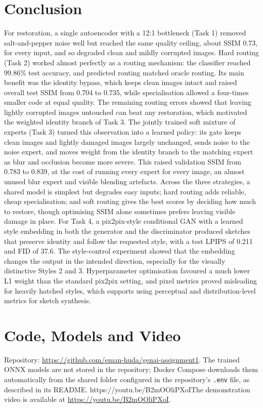 \documentclass[conference]{IEEEtran}
\newcommand*{\videourl}{https://youtu.be/B2mOOliPXoI}
\newcommand{\videosentence}{\ifx\videourl\empty\else The demonstration video is available at \url{\videourl}.\fi}
\begin{document}
\section{Conclusion}
For restoration, a single autoencoder with a 12:1 bottleneck (Task 1) removed salt-and-pepper noise well but reached the same quality ceiling, about SSIM 0.73, for every input, and so degraded clean and mildly corrupted images. Hard routing (Task 2) worked almost perfectly as a routing mechanism: the classifier reached 99.86\% test accuracy, and predicted routing matched oracle routing. Its main benefit was the identity bypass, which keeps clean images intact and raised overall test SSIM from 0.704 to 0.735, while specialisation allowed a four-times smaller code at equal quality. The remaining routing errors showed that leaving lightly corrupted images untouched can beat any restoration, which motivated the weighted identity branch of Task 3. The jointly trained soft mixture of experts (Task 3) turned this observation into a learned policy: its gate keeps clean images and lightly damaged images largely unchanged, sends noise to the noise expert, and moves weight from the identity branch to the matching expert as blur and occlusion become more severe. This raised validation SSIM from 0.783 to 0.839, at the cost of running every expert for every image, an almost unused blur expert and visible blending artefacts. Across the three strategies, a shared model is simplest but degrades easy inputs; hard routing adds reliable, cheap specialisation; and soft routing gives the best scores by deciding how much to restore, though optimising SSIM alone sometimes prefers leaving visible damage in place.
For Task 4, a pix2pix-style conditional GAN with a learned style embedding in both the generator and the discriminator produced sketches that preserve identity and follow the requested style, with a test LPIPS of 0.211 and FID of 37.6. The style-control experiment showed that the embedding changes the output in the intended direction, especially for the visually distinctive Styles 2 and 3. Hyperparameter optimisation favoured a much lower L1 weight than the standard pix2pix setting, and pixel metrics proved misleading for heavily hatched styles, which supports using perceptual and distribution-level metrics for sketch synthesis.

\section*{Code, Models and Video}
Repository: \url{https://github.com/eman-huda/genai-assignment1}. The trained ONNX models are not stored in the repository; Docker Compose downloads them automatically from the shared folder configured in the repository's \texttt{.env} file, as described in its README. \videosentence
\end{document}
